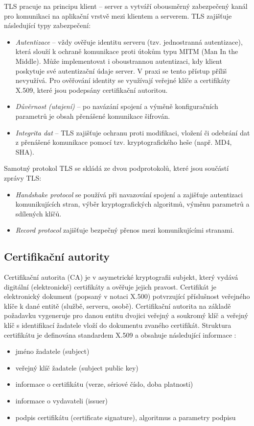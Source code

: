 TLS pracuje na principu klient -- server a vytváří obousměrný zabezpečený kanál pro komunikaci na aplikační vrstvě mezi klientem a serverem. TLS  zajišťuje následující typy zabezpečení:
\begin{itemize}
  \item {\em Autentizace} -- vždy ověřuje identitu serveru (tzv. jednostranná autentizace), která slouží k ochraně komunikace proti útokům typu MITM (Man In the Middle). Může implementovat i oboustrannou autentizaci, kdy klient poskytuje své autentizační údaje server. V praxi se tento přístup příliš nevyužívá. Pro ověřování identity se využívají veřejné klíče a certifikáty X.509, které jsou podepsány certifikační autoritou. 
  \item {\em Důvěrnost (utajení)} -- po navázání spojení a výměně konfiguračních parametrů je obsah přenášené komunikace šifrován. 
  \item {\em Integrita dat} -- TLS zajišťuje ochranu proti modifikaci, vložení či odebrání dat z přenášené komunikace pomocí tzv. kryptografického heše (např. MD4, SHA). 
\end{itemize}

Samotný protokol TLS se skládá ze dvou podprotokolů, které jsou součástí zprávy TLS:
\begin{itemize}
  \item \emph{Handshake protocol} se používá při navazování spojení a zajišťuje autentizaci komunikujících stran, výběr kryptografických algoritmů, výměnu parametrů a sdílených klíčů.
  \item \emph{Record protocol} zajišťuje bezpečný přenos mezi komunikujícími stranami.
\end{itemize}

\subsection{Certifikační autority}
Certifikační autorita (CA) je v asymetrické kryptografii subjekt, který vydává digitální (elektronické) certifikáty a ověřuje jejich pravost. Certifikát je elektronický dokument (popsaný v notaci X.500)  potvrzující příslušnost veřejného klíče k dané entitě (službě, serveru, osobě). Certifikační autorita na základě požadavku vygeneruje pro danou entitu dvojici veřejný a soukromý klíč a veřejný klíč s identifikací žadatele vloží do dokumentu zvaného certifikát. Struktura certifikátu je definována standardem X.509 a obsahuje následující informace \cite{rfc5280}:
\begin{itemize}
  \item jméno žadatele (subject)
  \item veřejný klíč žadatele (subject public key)
  \item informace o certifikátu (verze, sériové číslo, doba platnosti)
  \item informace o vydavateli (issuer)
  \item podpis certifikátu (certificate signature), algoritmus a parametry podpisu
\end{itemize}

